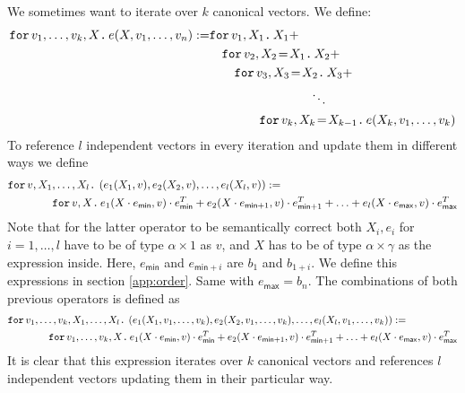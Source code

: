 We sometimes want to iterate over $k$ canonical vectors. We define:
\begin{align*}
  \ffor{v_1,\ldots, v_k}{X}{e(X,v_1,\ldots, v_n)}:= &\ffor{v_1}{X_1}{X_1 +} \\
  &\hspace{1em}\initf{X_1}{v_2}{X_2}{X_2 + } \\
  &\hspace{2em}\initf{X_2}{v_3}{X_3}{X_3 + } \\
  &\hspace{8em}\ddots \\
  &\hspace{4em}\initf{X_{k-1}}{v_k}{X_k}{ e(X_k,v_1,\ldots, v_k)}
\end{align*}
To reference $l$ independent vectors in every iteration and update them in different ways we define
\begin{align*}
&\ffor{v}{X_1,\ldots, X_l}{\left( e_1(X_1,v), e_2(X_2,v), \ldots, e_l(X_l,v) \right)} :=\\
&\hspace{4em}\ffor{v}{X}{e_1(X\cdot e_{\mathsf{min}},v)\cdot e_{\mathsf{min}}^T + e_2(X\cdot e_{\mathsf{min} + 1},v)\cdot e_{\mathsf{min} + 1}^T + \ldots + e_l(X\cdot e_{\mathsf{max}},v)\cdot e_{\mathsf{max}}^T}
\end{align*}
Note that for the latter operator to be semantically correct both $X_i,e_i$ for $ i=1,\ldots,l$ have to be of type $\alpha\times 1$ as $v$, and $X$ has to be of type $\alpha\times\gamma$ as the expression inside.
Here, $e_{\mathsf{min}}$ and $e_{\mathsf{min} + i}$ are $b_1$ and $b_{1+i}$. We define this expressions in section \ref{app:order}. Same with $e_{\mathsf{max}}=b_n$.
The combinations of both previous operators is defined as
\begin{align*}
&\ffor{v_1,\ldots, v_k}{X_1,\ldots, X_l}{\left( e_1(X_1,v_1,\ldots, v_k), e_2(X_2,v_1,\ldots, v_k), \ldots, e_l(X_l,v_1,\ldots, v_k) \right)} :=\\
&\hspace{4em}\ffor{v_1,\ldots, v_k}{X}{e_1(X\cdot e_{\mathsf{min}},v)\cdot e_{\mathsf{min}}^T + e_2(X\cdot e_{\mathsf{min} + 1},v)\cdot e_{\mathsf{min} + 1}^T + \ldots + e_l(X\cdot e_{\mathsf{max}},v)\cdot e_{\mathsf{max}}^T}
\end{align*}
It is clear that this expression iterates over $k$ canonical vectors and references $l$ independent vectors updating them in their particular way.